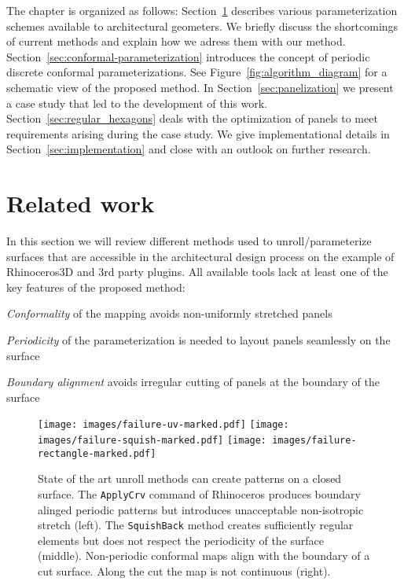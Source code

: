 \documentclass[Thesis.tex]{subfiles}
\begin{document}
The chapter is organized as follows:
Section~\ref{sec:parameterization} describes various parameterization
schemes available to architectural geometers. We briefly discuss the
shortcomings of current methods and explain how we adress them with our method.
Section~\ref{sec:conformal-parameterization} introduces the concept of
periodic discrete conformal parameterizations.  See
Figure~\ref{fig:algorithm_diagram} for a schematic view of the
proposed method. In Section~\ref{sec:panelization} we present a case
study that led to the development of this
work. Section~\ref{sec:regular_hexagons} deals with the optimization
of panels to meet requirements arising during the case study. We give
implementational details in Section~\ref{sec:implementation} and close
with an outlook on further research.

\section{Related work}
\label{sec:parameterization}

In this section we will review different methods used to
unroll/parameterize surfaces that are accessible in the architectural
design process on the example of Rhinoceros3D and 3rd party
plugins. All available tools lack at least one of the key features of
the proposed method:
\smallskip
\begin{compactitem}[$\bullet$]
\item \emph{Conformality} of the mapping avoids non-uniformly stretched
  panels
\item \emph{Periodicity} of the parameterization is needed to layout
  panels seamlessly on the surface
\item \emph{Boundary alignment} avoids irregular cutting of panels 
at the boundary of the surface  
\end{compactitem}

\begin{figure}[tb]
\centering
\texttt{[image: images/failure-uv-marked.pdf]}
\texttt{[image: images/failure-squish-marked.pdf]}
\texttt{[image: images/failure-rectangle-marked.pdf]}
\caption{State of the art unroll methods can create patterns on a
  closed surface.  The {\tt ApplyCrv} command of Rhinoceros produces
  boundary alinged periodic patterns but introduces unacceptable
  non-isotropic stretch (left). The {\tt SquishBack} method creates
  sufficiently regular elements but does not respect the periodicity
  of the surface (middle).  Non-periodic conformal maps align with the
  boundary of a cut surface. Along the cut the map is not continuous
  (right).}
\label{fig:failure}
\end{figure}
\end{document}
